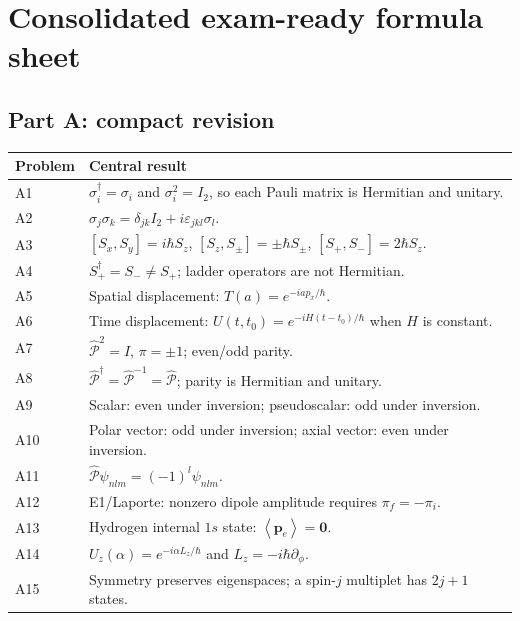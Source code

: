 \documentclass[11pt,a4paper]{article}
\theoremstyle{definition}
\newcommand{\avg}[1]{\left\langle #1\right\rangle}
\newcommand{\PP}{\hat{\mathcal P}}
\begin{document}
\section{Consolidated exam-ready formula sheet}
\subsection*{Part A: compact revision}
\begin{center}\small
\begin{tabularx}{\textwidth}{@{}p{}X@{}}\toprule
Problem & Central result \\ \midrule
A1 & $\sigma_i^\dagger=\sigma_i$ and $\sigma_i^2=I_2$, so each Pauli matrix is Hermitian and unitary.\\
A2 & $\sigma_j\sigma_k=\delta_{jk}I_2+i\varepsilon_{jkl}\sigma_l$.\\
A3 & $[S_x,S_y]=i\hbar S_z$, $[S_z,S_\pm]=\pm\hbar S_\pm$, $[S_+,S_-]=2\hbar S_z$.\\
A4 & $S_+^\dagger=S_-\ne S_+$; ladder operators are not Hermitian.\\
A5 & Spatial displacement: $T(a)=e^{-iap_x/\hbar}$.\\
A6 & Time displacement: $U(t,t_0)=e^{-iH(t-t_0)/\hbar}$ when $H$ is constant.\\
A7 & $\PP^2=I$, $\pi=\pm1$; even/odd parity.\\
A8 & $\PP^\dagger=\PP^{-1}=\PP$; parity is Hermitian and unitary.\\
A9 & Scalar: even under inversion; pseudoscalar: odd under inversion.\\
A10 & Polar vector: odd under inversion; axial vector: even under inversion.\\
A11 & $\PP\psi_{nlm}=(-1)^l\psi_{nlm}$.\\
A12 & E1/Laporte: nonzero dipole amplitude requires $\pi_f=-\pi_i$.\\
A13 & Hydrogen internal $1s$ state: $\avg{\mathbf p_e}=\mathbf0$.\\
A14 & $U_z(\alpha)=e^{-i\alpha L_z/\hbar}$ and $L_z=-i\hbar\partial_\phi$.\\
A15 & Symmetry preserves eigenspaces; a spin-$j$ multiplet has $2j+1$ states.\\ \bottomrule
\end{tabularx}
\end{center}
\end{document}

